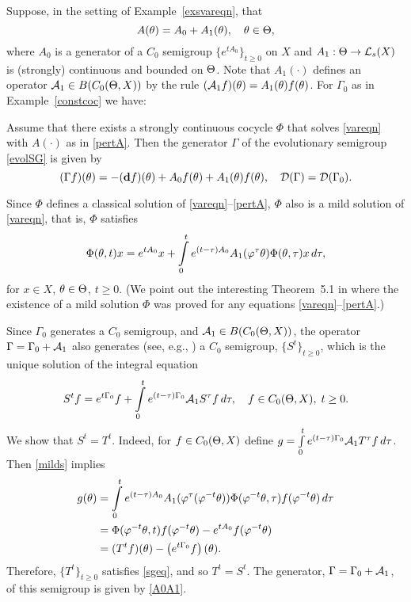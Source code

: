 \begin{exmp}
Suppose, in the setting of Example~\ref{exsvareqn}, that
\begin{equation}\lb{pertA}
A(\th)=A_0+A_1(\th),\quad \th\in \TH,
\end{equation}
where $A_0$ is a generator of a
$C_0$ semigroup $\{e^{tA_0}\}_{t\ge 0}$ on $X$ and $A_1: \Theta\to
{\cal{L}}_s(X)$ is (strongly) continuous and bounded on $\Theta$. Note
that $A_1(\cdot)$ defines an operator ${\cal{A}}_1\in B(C_0(\Theta,X))$ by the
rule $({\cal{A}}_1f)(\theta)=A_1(\theta)f(\theta)$. For $\Gamma_0$ as in
Example~\ref{constcoc} we have:

\begin{prop} Assume that there
exists a strongly continuous cocycle $\Phi$ that solves
\eqref{vareqn} with $A(\cdot)$ as in \eqref{pertA}.
Then the generator $\Gamma$ of the evolutionary semigroup
\eqref{evolSG} is given by
\begin{equation}\lb{A0A1}
(\Gamma f)(\th)=-(\bd f)(\th)+A_0f(\th)+A_1(\th)f(\th),\quad
\calD(\Gamma)=\calD(\Gamma_0).
\end{equation}
\end{prop}

\begin{pf} Since $\Phi$ defines a classical solution of
\eqref{vareqn}--\eqref{pertA}, $\Phi$  also is a mild solution of
\eqref{vareqn}, that is, $\Phi$ satisfies
\begin{equation}\lb{milds}
\Phi(\th,t)x=e^{tA_0}x+\int\limits_0^te^{(t-\tau)A_0}A_1(\vphi^\tau
\th)\Phi(\th,\tau)x\, d\tau,
 \end{equation}
for $x\in X$, $\theta\in \Theta$, $t\ge 0$.
(We point out the interesting Theorem~5.1 in \cite{ChLe3} where the
existence of a mild solution $\Phi$ was proved for any equations
\eqref{vareqn}--\eqref{pertA}.)

Since $\Gamma_0$ generates a $C_0$ semigroup, and ${\cal{A}}_1\in
B(C_0(\Theta,X))$, the operator $\Gamma=\Gamma_0+{\cal{A}}_1$ also
generates (see, e.g., \cite[p.~77]{Pazy}) a $C_0$ semigroup,
$\{S^t\}_{t\ge 0}$, which is the unique solution of the integral
equation
\begin{equation}\lb{sgeq}
S^tf=e^{t\Gamma_0}f+\int\limits_0^te^{(t-\tau)\Gamma_0}\calA_1S^\tau
f\, d\tau,\quad f\in\co, \; t\ge 0.
 \end{equation}
We show that $S^t=T^t$. Indeed,
for $f\in C_0(\Theta,X)$ define
$g=\int\limits_0^te^{(t-\tau)\Gamma_0}{\cal{A}}_1T^\tau
f\, d\tau$.
Then \eqref{milds} implies
$$\begin{aligned}
g(\theta)&=  \int\limits_0^te^{(t-\tau)A_0}A_1(\varphi^\tau(\varphi^{-t}\theta))
\Phi(\varphi^{-t}\theta,\tau)f(\varphi^{-t}\theta)\,d\tau\\
&=\Phi(\varphi^{-t}\theta,t)f(\varphi^{-t}\theta)-e^{tA_0}f(\varphi^{-t}\theta)\\
&=(T^tf)(\theta)-\left(e^{t\Gamma_0}f\right)(\theta).
\end{aligned}$$
Therefore, $\{T^t\}_{t\ge0}$ satisfies \eqref{sgeq}, and so $T^t=S^t$.
The generator, $\Gamma=\Gamma_0+{\cal{A}}_1$, of this semigroup is given by
\eqref{A0A1}.
 \end{pf}
\end{exmp}

